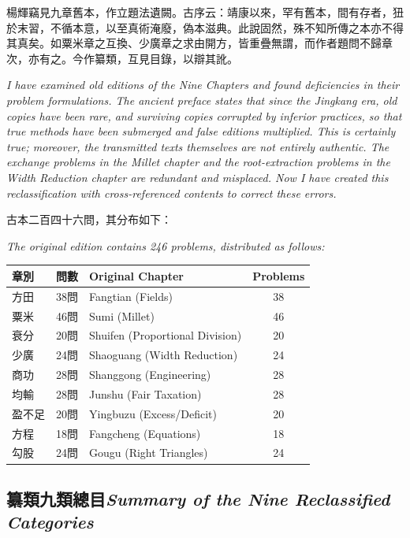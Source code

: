 \documentclass[10pt,a4paper]{article}
\newcommand{\bilingual}[2]{%
  \par\smallskip\noindent
  \begin{minipage}[t]{0.48\textwidth}
    \setlength{\parindent}{0pt}
    \setlength{\parskip}{4pt plus 1pt minus 1pt}
    #1
  \end{minipage}%
  \hfill
  \begin{minipage}[t]{0.48\textwidth}
    \setlength{\parindent}{0pt}
    \setlength{\parskip}{4pt plus 1pt minus 1pt}
    \small\textit{#2}%
  \end{minipage}
  \par\smallskip
}
\newcommand{\bilingualsubsection}[2]{%
  \subsection{#1\hfill\textnormal{\small\textit{#2}}}
}
\begin{document}
\bilingual{%
楊輝竊見九章舊本，作立題法遺闕。古序云：靖康以來，罕有舊本，間有存者，狃於末習，不循本意，以至真術淹廢，偽本滋典。此說固然，殊不知所傳之本亦不得其真矣。如粟米章之互換、少廣章之求由開方，皆重疊無謂，而作者題問不歸章次，亦有之。今作纂類，互見目錄，以辯其訛。
}{%
I have examined old editions of the \textit{Nine Chapters} and found deficiencies in their problem formulations. The ancient preface states that since the Jingkang era, old copies have been rare, and surviving copies corrupted by inferior practices, so that true methods have been submerged and false editions multiplied. This is certainly true; moreover, the transmitted texts themselves are not entirely authentic. The exchange problems in the Millet chapter and the root-extraction problems in the Width Reduction chapter are redundant and misplaced. Now I have created this reclassification with cross-referenced contents to correct these errors.
}

\bilingual{%
古本二百四十六問，其分布如下：
}{%
The original edition contains 246 problems, distributed as follows:
}

\begin{center}
\small
\begin{tabular}{|l|c|l|c|}
\hline
\textbf{章別} & \textbf{問數} & \textbf{Original Chapter} & \textbf{Problems} \\
\hline
方田 & 38問 & Fangtian (Fields) & 38 \\
粟米 & 46問 & Sumi (Millet) & 46 \\
衰分 & 20問 & Shuifen (Proportional Division) & 20 \\
少廣 & 24問 & Shaoguang (Width Reduction) & 24 \\
商功 & 28問 & Shanggong (Engineering) & 28 \\
均輸 & 28問 & Junshu (Fair Taxation) & 28 \\
盈不足 & 20問 & Yingbuzu (Excess/Deficit) & 20 \\
方程 & 18問 & Fangcheng (Equations) & 18 \\
勾股 & 24問 & Gougu (Right Triangles) & 24 \\
\hline
\end{tabular}
\end{center}

\bilingualsubsection{纂類九類總目}{Summary of the Nine Reclassified Categories}
\end{document}
